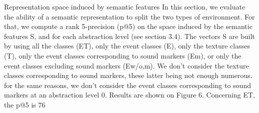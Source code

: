 Representation space induced by semantic features In this section, we evaluate the ability of a semantic representation to split the two types of environment. For that, we compute a rank 5-precision (p@5) on the space induced by the semantic features S, and for each abstraction level (see section 3.4). The vectors S are built by using all the classes (ET), only the event classes (E), only the texture classes (T), only the event classes corresponding to sound markers (Em), or only the event classes excluding sound markers (Ew/o,m). We don’t consider the texture classes corresponding to sound markers, these latter being not enough numerous. for the same reasons, we don’t consider the event classes corresponding to sound markers at an abstraction level 0. Results are shown on Figure 6. Concerning ET, the p@5 is 76%
